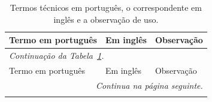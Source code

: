 \begin{longtable}{p{3.3cm} p{3.3cm} p{8.4cm}}
  \caption{Termos técnicos em português, o correspondente em inglês e a observação de uso.}
  \label{tab:glossario} \\
  \toprule
  Termo em português & Em inglês & Observação \\
  \midrule
  \endfirsthead

  \multicolumn{3}{l}{\small\itshape Continuação da Tabela~\ref{tab:glossario}.} \\
  \toprule
  Termo em português & Em inglês & Observação \\
  \midrule
  \endhead

  \midrule
  \multicolumn{3}{r}{\small\itshape Continua na página seguinte.} \\
  \endfoot

  \bottomrule
  \endlastfoot


\end{longtable}
